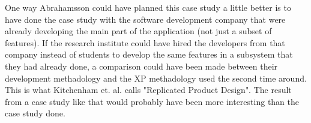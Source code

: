 One way Abrahamsson could have planned this case study a little better is to
have done the case study with the software development company that were
already developing the main part of the application (not just a subset of
features). If the research institute could have hired the developers from that
company instead of students to develop the same features in a subsystem that
they had already done, a comparison could have been made between their
development methadology and the XP methadology used the second time around.
This is what Kitchenham et. al. \cite{kitchenham1995} calls "Replicated Product
Design". The result from a case study like that would probably have been more
interesting than the case study done.
\newpage

